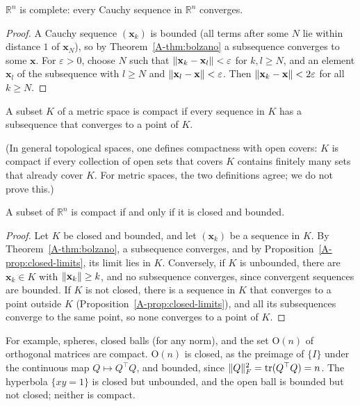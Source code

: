 \begin{corollary}\label{A-cor:complete}
    $\mathbb{R}^n$ is complete: every Cauchy sequence in $\mathbb{R}^n$ converges.
\end{corollary}

\begin{proof}
    A Cauchy sequence $(\mathbf{x}_k)$ is bounded (all terms after some $N$ lie within distance $1$ of $\mathbf{x}_N$), so by Theorem~\ref{A-thm:bolzano} a subsequence converges to some $\mathbf{x}$. For $\varepsilon > 0$, choose $N$ such that $\lVert \mathbf{x}_k - \mathbf{x}_l \rVert < \varepsilon$ for $k, l \geq N$, and an element $\mathbf{x}_l$ of the subsequence with $l \geq N$ and $\lVert \mathbf{x}_l - \mathbf{x} \rVert < \varepsilon$. Then $\lVert \mathbf{x}_k - \mathbf{x} \rVert < 2\varepsilon$ for all $k \geq N$.
\end{proof}

\begin{definition}\label{A-def:compact}
    A subset $K$ of a metric space is compact if every sequence in $K$ has a subsequence that converges to a point of $K$.
\end{definition}

(In general topological spaces, one defines compactness with open covers: $K$ is compact if every collection of open sets that covers $K$ contains finitely many sets that already cover $K$. For metric spaces, the two definitions agree; we do not prove this.)

\begin{theorem}\label{A-thm:heine-borel}
    A subset of $\mathbb{R}^n$ is compact if and only if it is closed and bounded.
\end{theorem}

\begin{proof}
    Let $K$ be closed and bounded, and let $(\mathbf{x}_k)$ be a sequence in $K$. By Theorem~\ref{A-thm:bolzano}, a subsequence converges, and by Proposition~\ref{A-prop:closed-limits}, its limit lies in $K$. Conversely, if $K$ is unbounded, there are $\mathbf{x}_k \in K$ with $\lVert \mathbf{x}_k \rVert \geq k$, and no subsequence converges, since convergent sequences are bounded. If $K$ is not closed, there is a sequence in $K$ that converges to a point outside $K$ (Proposition~\ref{A-prop:closed-limits}), and all its subsequences converge to the same point, so none converges to a point of $K$.
\end{proof}

For example, spheres, closed balls (for any norm), and the set $\mathrm{O}(n)$ of orthogonal matrices are compact. $\mathrm{O}(n)$ is closed, as the preimage of $\{I\}$ under the continuous map $Q \mapsto Q^\top Q$, and bounded, since $\lVert Q \rVert_F^2 = \operatorname{tr}(Q^\top Q) = n$. The hyperbola $\{xy = 1\}$ is closed but unbounded, and the open ball is bounded but not closed; neither is compact.

